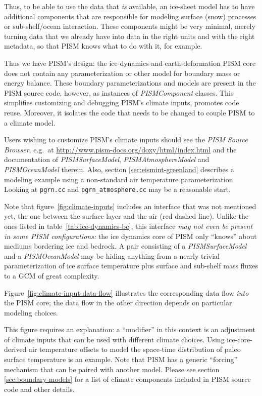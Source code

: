 \documentclass[titlepage,letterpaper,final]{scrartcl}
\begin{document}
Thus, to be able to use the data that \emph{is} available, an ice-sheet model has to
have additional components that are responsible for modeling surface (snow)
processes or sub-shelf/ocean interaction.  These components might be very minimal, merely turning data that we already have into data in the right units and with the right metadata, so that PISM knows what to do with it, for example.

Thus we have PISM's design: the ice-dynamics-and-earth-deformation PISM
core does not contain any parameterization or other model for boundary mass or
energy balance.  These boundary parameterizations and models are present in the PISM source code, however, as instances of \emph{PISMComponent} classes.  This simplifies customizing and debugging PISM's climate
inputs, promotes code reuse.  Moreover, it isolates the code that needs to be changed to
couple PISM to a climate model.

Users wishing to customize PISM's climate inputs should see the \emph{PISM
  Source Browser}, e.g.~at
\url{http://www.pism-docs.org/doxy/html/index.html} and the documentation
of \emph{PISMSurfaceModel}, \emph{PISMAtmosphereModel} and
\emph{PISMOceanModel} therein.  Also, section \ref{sec:eismint-greenland} describes a
modeling example using a non-standard air temperature parameterization. Looking
at \texttt{pgrn.cc} and \texttt{pgrn_atmosphere.cc} may be a reasonable
start.

Note that figure~\ref{fig:climate-inputs} includes an interface that was not
mentioned yet, the one between the surface layer and the air (red dashed line).
Unlike the ones listed in table~\ref{tab:ice-dynamics-bc}, this interface
\emph{may not even be present in some PISM configurations:} the ice dynamics
core of PISM only ``knows'' about mediums bordering ice and bedrock. A pair
consisting of a \emph{PISMSurfaceModel} and a \emph{PISMOceanModel} may be
hiding anything from a nearly trivial parameterization of ice surface
temperature plus surface and sub-shelf mass fluxes to a GCM of great
complexity.

Figure~\ref{fig:climate-input-data-flow} illustrates the corresponding data
flow \emph{into} the PISM core; the data flow in the other direction depends on
particular modeling choices.

This figure requires an explanation: a ``modifier'' in this context is an
adjustment of climate inputs that can be used with different climate
choices.  Using ice-core-derived air temperature offsets to model the space-time distribution of paleo surface temperature is an example.  Note that PISM has a generic ``forcing'' mechanism that can be paired with another model. Please see section \ref{sec:boundary-models} for
a list of climate components included in PISM source code and other details.
\end{document}
